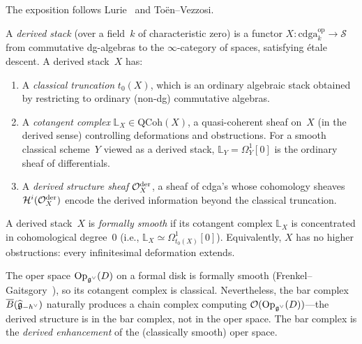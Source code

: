 The exposition follows
Lurie~\cite{HA} and To\"en--Vezzosi.

\begin{definition}
\label{def:derived-stack}
A \emph{derived stack} (over a field~$k$ of characteristic zero) is
a functor
$X\colon \mathrm{cdga}_k^{\mathrm{op}} \to \mathcal{S}$
from commutative dg-algebras to the $\infty$-category of spaces,
satisfying \'etale descent.  A derived stack~$X$ has:
\begin{enumerate}[label=\textup{(\roman*)}]
\item A \emph{classical truncation} $t_0(X)$, which is an ordinary
  algebraic stack obtained by restricting to ordinary (non-dg)
  commutative algebras.
\item A \emph{cotangent complex} $\mathbb{L}_X \in \mathrm{QCoh}(X)$,
  a quasi-coherent sheaf on~$X$ (in the derived sense) controlling
  deformations and obstructions.  For a smooth classical
  scheme~$Y$ viewed as a derived stack, $\mathbb{L}_Y = \Omega^1_Y[0]$
  is the ordinary sheaf of differentials.
\item A \emph{derived structure sheaf} $\mathcal{O}_X^{\mathrm{der}}$,
  a sheaf of cdga's whose cohomology sheaves
  $\mathcal{H}^i(\mathcal{O}_X^{\mathrm{der}})$ encode the derived
  information beyond the classical truncation.
\end{enumerate}
\end{definition}

\begin{definition}
\label{def:formal-smoothness}
A derived stack~$X$ is \emph{formally smooth} if its cotangent
complex $\mathbb{L}_X$ is concentrated in cohomological degree~$0$
(i.e., $\mathbb{L}_X \simeq \Omega^1_{t_0(X)}[0]$).  Equivalently,
$X$ has no higher obstructions: every infinitesimal deformation
extends.
\end{definition}

\begin{remark}
\label{rem:formal-smooth-derived}
The oper space $\mathrm{Op}_{\mathfrak{g}^\vee}(D)$ on a formal disk is
formally smooth (Frenkel--Gaitsgory~\cite{FG06}), so its cotangent
complex is classical.  Nevertheless, the bar complex
$\overline{B}(\widehat{\mathfrak{g}}_{-h^\vee})$ naturally produces a chain complex
computing $\mathcal{O}(\mathrm{Op}_{\mathfrak{g}^\vee}(D))$---the derived structure
is in the bar complex, not in the oper space.  The bar complex is the
\emph{derived enhancement} of the (classically smooth) oper space.
\end{remark}




